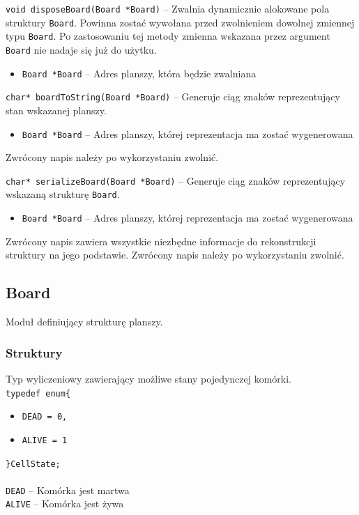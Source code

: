 \documentclass{article}
\begin{document}
\vspace{5mm}
\noindent{}\texttt{void disposeBoard(Board *Board)} -- Zwalnia dynamicznie alokowane pola struktury \texttt{Board}. Powinna zostać wywołana przed zwolnieniem dowolnej zmiennej typu \texttt{Board}. Po zastosowaniu tej metody zmienna wskazana przez argument \texttt{Board} nie nadaje się już do użytku.
\begin{itemize}[label={}]
	\item \texttt{Board *Board} -- Adres planszy, która będzie zwalniana
\end{itemize}

\vspace{5mm}
\noindent{}\texttt{char* boardToString(Board *Board)} -- Generuje ciąg znaków reprezentujący stan wskazanej planszy.
\begin{itemize}[label={}]
	\item \texttt{Board *Board} -- Adres planszy, której reprezentacja ma zostać wygenerowana
\end{itemize}
Zwrócony napis należy po wykorzystaniu zwolnić.

\vspace{5mm}
\noindent{}\texttt{char* serializeBoard(Board *Board)} -- Generuje ciąg znaków reprezentujący wskazaną strukturę \texttt{Board}.
\begin{itemize}[label={}]
	\item \texttt{Board *Board} -- Adres planszy, której reprezentacja ma zostać wygenerowana
\end{itemize}
Zwrócony napis zawiera wszystkie niezbędne informacje do rekonstrukcji struktury na jego podstawie. Zwrócony napis należy po wykorzystaniu zwolnić.

\subsection{Board}
Moduł definiujący strukturę planszy.

\subsubsection{Struktury}
Typ wyliczeniowy zawierający możliwe stany pojedynczej komórki. \\
\texttt{typedef enum\{}
\begin{itemize}[label={}, noitemsep, topsep=0pt]
	\item \texttt{DEAD = 0,}
	\item \texttt{ALIVE = 1}
\end{itemize}
\texttt{\}CellState;}\\\\
\texttt{DEAD} -- Komórka jest martwa \\
\texttt{ALIVE} -- Komórka jest żywa
\end{document}
